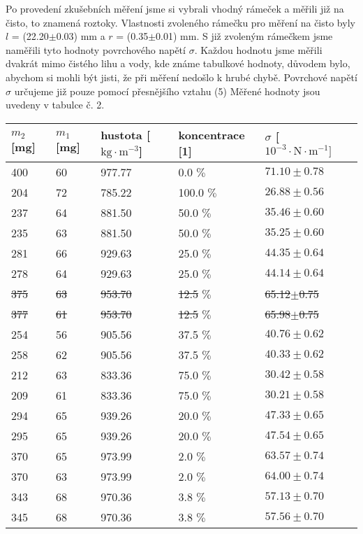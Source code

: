 \documentclass[a4paper]{article}
\begin{document}
\par Po provedení zkušebních měření jsme si vybrali vhodný rámeček a měřili již na čisto, to znamená roztoky. Vlastnosti zvoleného rámečku pro měření na čisto byly $l$ = (22.20$\pm$0.03) mm a $r$ = (0.35$\pm$0.01) mm.  S již zvoleným rámečkem jsme naměřili tyto hodnoty povrchového napětí $\sigma$. Každou hodnotu jsme měřili dvakrát mimo čistého lihu a vody, kde známe tabulkové hodnoty, důvodem bylo, abychom si mohli být jisti, že při měření nedošlo k hrubé chybě. Povrchové napětí $\sigma$ určujeme již pouze pomocí přesnějšího vztahu (5)  Měřené hodnoty jsou uvedeny v tabulce č. 2.
\begin{center}
     \label{tab:title}
    \begin{tabular}{ | l | l | l | l | l | p{3cm} |} \hline
    $m_{2}$ [mg] & $m_{1}$ [mg] & hustota [$\mathrm{kg\cdot m^{-3}}$] & koncentrace [1] & $\sigma$  [$10^{-3} \cdot  \mathrm {N \cdot m^{-1}}]$ \\ \hline
    400 & 60 & 977.77 & 0.0 $\%$   & $71.10\pm0.78$ \\ \hline
    204 & 72 & 785.22 & 100.0 $\%$ & $26.88\pm0.56$ \\ \hline
    237 & 64 & 881.50 & 50.0 $\%$  & $35.46\pm0.60$ \\ \hline
    235 & 63 & 881.50 & 50.0 $\%$  & $35.25\pm0.60$ \\ \hline
    281 & 66 & 929.63 & 25.0 $\%$  & $44.35\pm0.64$ \\ \hline
    278 & 64 & 929.63 & 25.0 $\%$  & $44.14\pm0.64$ \\ \hline
    \st{375} & \st{63} & \st{953.70} & \st{12.5} $\%$  & \st{65.12}$\pm$\st{0.75} \\ \hline
    \st{377} & \st{61} & \st{953.70} & \st{12.5} $\%$  & \st{65.98}$\pm$\st{0.75} \\ \hline
    254 & 56 & 905.56 & 37.5 $\%$  & $40.76\pm0.62$ \\ \hline
    258 & 62 & 905.56 & 37.5 $\%$  & $40.33\pm0.62$ \\ \hline
    212 & 63 & 833.36 & 75.0 $\%$  & $30.42\pm0.58$ \\ \hline
    209 & 61 & 833.36 & 75.0 $\%$  & $30.21\pm0.58$ \\ \hline
    294 & 65 & 939.26 & 20.0 $\%$  & $47.33\pm0.65$ \\ \hline
    295 & 65 & 939.26 & 20.0 $\%$  & $47.54\pm0.65$ \\ \hline
    370 & 65 & 973.99 & 2.0 $\%$   & $63.57\pm0.74$ \\ \hline
    370 & 63 & 973.99 & 2.0 $\%$   & $64.00\pm0.74$ \\ \hline
    343 & 68 & 970.36 & 3.8 $\%$   & $57.13\pm0.70$ \\ \hline
    345 & 68 & 970.36 & 3.8 $\%$   & $57.56\pm0.70$ \\ \hline
    \end{tabular}
\end{center}
\end{document}
